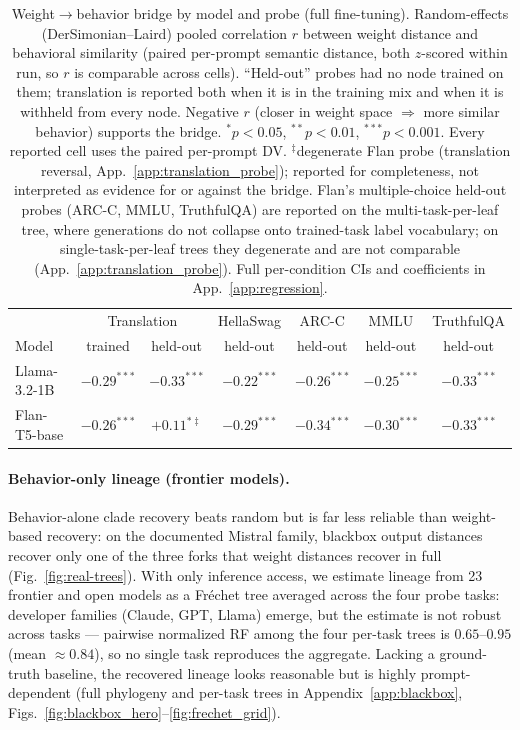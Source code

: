 \documentclass{article}
\theoremstyle{definition}
\theoremstyle{plain}
\begin{document}
\begin{table}[t]
\caption{Weight$\to$behavior bridge by model and probe (full fine-tuning). Random-effects
(DerSimonian--Laird) pooled correlation $r$ between weight distance and behavioral similarity (paired
per-prompt semantic distance, both $z$-scored within run, so $r$ is comparable across cells). ``Held-out''
probes had no node trained on them; translation is reported both when it is in the training mix and when
it is withheld from every node. Negative $r$ (closer in weight space $\Rightarrow$ more similar behavior)
supports the bridge. $^{*}p<0.05$, $^{**}p<0.01$, $^{***}p<0.001$. Every reported cell uses the paired
per-prompt DV. $^\ddagger$degenerate Flan probe (translation reversal, App.~\ref{app:translation_probe});
reported for completeness, not interpreted as evidence for or against the bridge. Flan's
multiple-choice held-out probes (ARC-C, MMLU, TruthfulQA) are reported on the multi-task-per-leaf tree,
where generations do not collapse onto trained-task label vocabulary; on single-task-per-leaf trees they
degenerate and are not comparable (App.~\ref{app:translation_probe}). Full
per-condition CIs and coefficients in App.~\ref{app:regression}.}
\label{tab:behavior_holdout}
\centering
\small
\setlength{\tabcolsep}{5pt}
\begin{tabular}{lcccccc}
\toprule
 & \multicolumn{2}{c}{Translation} & HellaSwag & ARC-C & MMLU & TruthfulQA \\
\cmidrule(lr){2-3}
Model & trained & held-out & held-out & held-out & held-out & held-out \\
\midrule
Llama-3.2-1B & $-0.29^{***}$ & $-0.33^{***}$ & $-0.22^{***}$ & $-0.26^{***}$ & $-0.25^{***}$ & $-0.33^{***}$ \\
Flan-T5-base & $-0.26^{***}$ & $+0.11^{*\ddagger}$ & $-0.29^{***}$ & $-0.34^{***}$ & $-0.30^{***}$ & $-0.33^{***}$ \\
\bottomrule
\end{tabular}
\end{table}


\paragraph{Behavior-only lineage (frontier models).}
\label{sec:results:blackbox}

Behavior-alone clade recovery beats random but is far less reliable than weight-based recovery: on the
documented Mistral family, blackbox output distances recover only one of the three forks that weight
distances recover in full (Fig.~\ref{fig:real-trees}). With only inference access, we estimate lineage from 23 frontier
and open models as a Fr\'echet tree averaged across the four probe tasks: developer families (Claude,
GPT, Llama) emerge, but the estimate is not robust across tasks --- pairwise normalized RF among the
four per-task trees is $0.65$--$0.95$ (mean $\approx 0.84$), so no single task reproduces the aggregate.
Lacking a ground-truth baseline, the recovered lineage looks reasonable but is highly prompt-dependent
(full phylogeny and per-task trees in Appendix~\ref{app:blackbox},
Figs.~\ref{fig:blackbox_hero}--\ref{fig:frechet_grid}).
\end{document}
